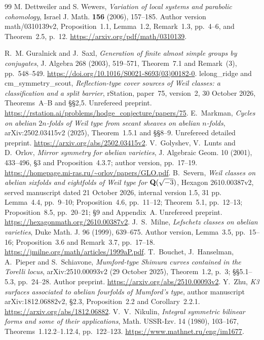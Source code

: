 \begin{thebibliography}{99}
M. Dettweiler and S. Wewers, \emph{Variation of local systems and
parabolic cohomology}, Israel J. Math. \textbf{156} (2006), 157--185.
Author version math/0310139v2, Proposition~1.1, Lemma~1.2,
Remark~1.3, pp.~4--6, and Theorem~2.5, p.~12.
\url{https://arxiv.org/pdf/math/0310139}.

 R.~M. Guralnick and J.~Saxl, \emph{Generation of finite almost simple groups by conjugates}, J. Algebra 268 (2003), 519--571, Theorem~7.1 and Remark~(3), pp.~548--549. \url{https://doi.org/10.1016/S0021-8693(03)00182-0}.
 lelong\_ridge and cm\_symmetry\_scout, \emph{Reflection-type cover sources of Weil classes: a classification and a split barrier}, rStation, paper~75, version~2, 30 October 2026, Theorems~A--B and \S\S2,5. Unrefereed preprint. \url{https://rstation.ai/problems/hodge_conjecture/papers/75}.
 E.~Markman, \emph{Cycles on abelian $2n$-folds of Weil type from secant sheaves on abelian $n$-folds}, arXiv:2502.03415v2 (2025), Theorem~1.5.1 and \S\S8--9. Unrefereed detailed preprint. \url{https://arxiv.org/abs/2502.03415v2}.
 V.~Golyshev, V.~Lunts and D.~Orlov, \emph{Mirror symmetry for abelian varieties}, J. Algebraic Geom. 10 (2001), 433--496, \S3 and Proposition~4.3.7; author version, pp.~17--19. \url{https://homepage.mi-ras.ru/~orlov/papers/GLO.pdf}.
 B.~Severn, \emph{Weil classes on abelian sixfolds and eightfolds of Weil type for $\mathbf Q(\sqrt{-3})$}, Hexagon 2610.00387v2, served manuscript dated 21 October 2026, internal version 1.5, 31 pp. Lemma~4.4, pp.~9--10; Proposition~4.6, pp.~11--12; Theorem~5.1, pp.~12--13; Proposition~8.5, pp.~20--21; \S9 and Appendix~A. Unrefereed preprint. \url{https://hexagonmath.org/2610.00387v2}.
 J.~S.~Milne, \emph{Lefschetz classes on abelian varieties}, Duke Math. J. 96 (1999), 639--675. Author version, Lemma~3.5, pp.~15--16; Proposition~3.6 and Remark~3.7, pp.~17--18. \url{https://jmilne.org/math/articles/1999aP.pdf}.
 T.~Bouchet, J.~Hanselman, A.~Pieper and S.~Schiavone, \emph{Mumford-type Shimura curves contained in the Torelli locus}, arXiv:2510.00093v2 (29 October 2025), Theorem~1.2, p.~3; \S\S5.1--5.3, pp.~24--28. Author preprint. \url{https://arxiv.org/abs/2510.00093v2}.
 Y.~Zhu, \emph{K3 surfaces associated to abelian fourfolds of Mumford's type}, author manuscript arXiv:1812.06882v2, \S2.3, Proposition~2.2 and Corollary~2.2.1. \url{https://arxiv.org/abs/1812.06882}.
 V.~V.~Nikulin, \emph{Integral symmetric bilinear forms and some of their applications}, Math. USSR-Izv. 14 (1980), 103--167, Theorems~1.12.2--1.12.4, pp.~122--123. \url{https://www.mathnet.ru/eng/im1677}.

\end{thebibliography}
